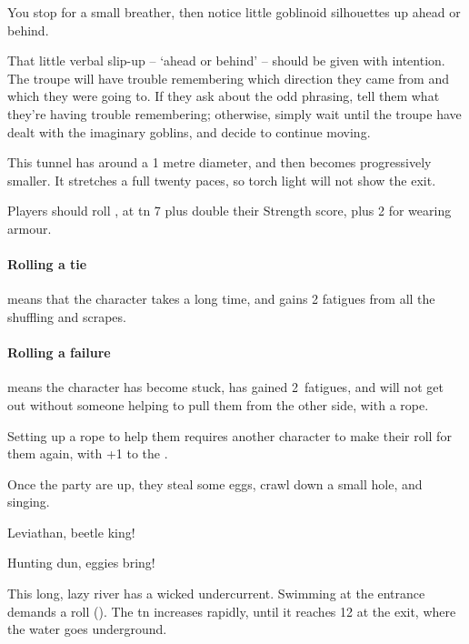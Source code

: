 \begin{multicols}{2}
\begin{boxtext}
  You stop for a small breather, then notice little goblinoid silhouettes up ahead or behind.
\end{boxtext}

That little verbal slip-up -- `ahead or behind' -- should be given with intention.
The troupe will have trouble remembering which direction they came from and which they were going to.
If they ask about the odd phrasing, tell them what they're having trouble remembering; otherwise, simply wait until the troupe have dealt with the imaginary goblins, and decide to continue moving.


This tunnel has around a 1 metre diameter, and then becomes progressively smaller.
It stretches a full twenty paces, so torch light will not show the exit.

Players should roll , at \gls{tn} 7 plus double their Strength score, plus 2 for wearing armour.

\paragraph{Rolling a tie}
means that the character takes a long time, and gains 2 \glspl{fatigue} from all the shuffling and scrapes.

\paragraph{Rolling a failure}
means the character has become stuck, has gained 2~\glspl{fatigue}, and will not get out without someone helping to pull them from the other side, with a rope.

Setting up a rope to help them requires another character to make their roll for them again, with +1 to the .


Once the party are up, they steal some eggs, crawl down a small hole, and singing.

\begin{speechtext}
  Leviathan, beetle king!

  \noindent
  Hunting dun, eggies bring!
\end{speechtext}


This long, lazy river has a wicked undercurrent.
Swimming at the entrance demands a  roll (\tn[6]).
The \gls{tn} increases rapidly, until it reaches 12 at the exit, where the water goes underground.


\end{multicols}
